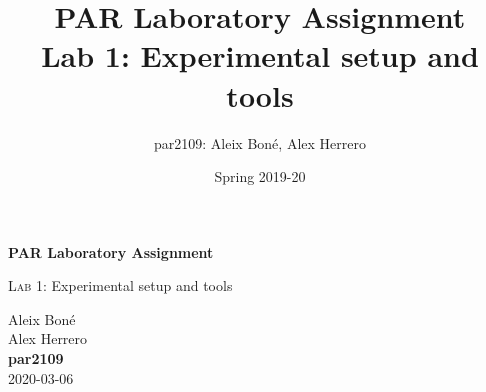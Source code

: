 

\usepackage{caption}
\usepackage{subcaption}
\usepackage{graphicx}

\usepackage{siunitx}

\renewcommand\theadfont{\bfseries}

\title{
    PAR Laboratory Assignment\\
    Lab 1: Experimental setup and tools
}

\author{
    par2109:
    Aleix Boné,
    Alex Herrero
}

\date{
    Spring 2019-20
}



\thispagestyle{empty}
\clearpage
\setcounter{page}{-1}

\begin{titlepage}
{
    \centering
    \null
\vspace{5em}
    {\Huge \bfseries PAR Laboratory Assignment\par}
    \vspace{3em}
    {\Large {\scshape Lab 1:} Experimental setup and tools\par}
    \vfill
    \vspace{10em}
    \vfill

    {\raggedleft \Large
        Aleix Boné\\
        Alex Herrero\\
        {\bfseries\ttfamily par2109}\\
        \vspace{4em}
        2020-03-06
        \par}
}
\end{titlepage}

\pagebreak

%


